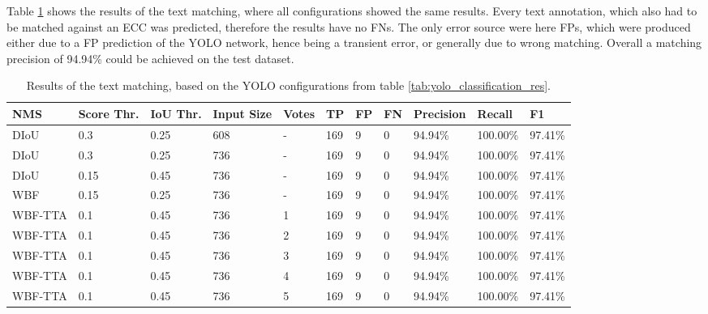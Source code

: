 Table \ref{tab:text_matching_results} shows the results of the text matching, where all configurations showed the same results.
Every text annotation, which also had to be matched against an \ac{ECC} was predicted, therefore the results have no \acp{FN}.
The only error source were here \acp{FP}, which were produced either due to a \ac{FP} prediction of the \ac{YOLO} network, hence being a transient error, or generally due to wrong matching.
Overall a matching precision of 94.94\% could be achieved on the test dataset.


\begin{table}
\footnotesize
\begin{center}
\begin{tabular}{|l|l|l|l|l|l|l|l|l|l|l|}

\hline
NMS     & Score Thr. & IoU Thr. & Input Size & Votes & TP  & FP & FN & Precision & Recall   & F1       \\
\hline
DIoU    & 0.3        & 0.25     & 608        & -     & 169 & 9  & 0  & 94.94\%   & 100.00\% & 97.41\%  \\
\hline
DIoU    & 0.3        & 0.25     & 736        & -     & 169 & 9  & 0  & 94.94\%   & 100.00\% & 97.41\%  \\
\hline
DIoU    & 0.15       & 0.45     & 736        & -     & 169 & 9  & 0  & 94.94\%   & 100.00\% & 97.41\%  \\
\hline
WBF     & 0.15       & 0.25     & 736        & -     & 169 & 9  & 0  & 94.94\%   & 100.00\% & 97.41\%  \\
\hline
WBF-TTA & 0.1        & 0.45     & 736        & 1     & 169 & 9  & 0  & 94.94\%   & 100.00\% & 97.41\%  \\
\hline
WBF-TTA & 0.1        & 0.45     & 736        & 2     & 169 & 9  & 0  & 94.94\%   & 100.00\% & 97.41\%  \\
\hline
WBF-TTA & 0.1        & 0.45     & 736        & 3     & 169 & 9  & 0  & 94.94\%   & 100.00\% & 97.41\%  \\
\hline
WBF-TTA & 0.1        & 0.45     & 736        & 4     & 169 & 9  & 0  & 94.94\%   & 100.00\% & 97.41\%  \\
\hline
WBF-TTA & 0.1        & 0.45     & 736        & 5     & 169 & 9  & 0  & 94.94\%   & 100.00\% & 97.41\%  \\
\hline

\end{tabular}
\caption{Results of the text matching, based on the \ac{YOLO} configurations from table \ref{tab:yolo_classification_res}.}
\label{tab:text_matching_results}
\end{center}
\end{table}

